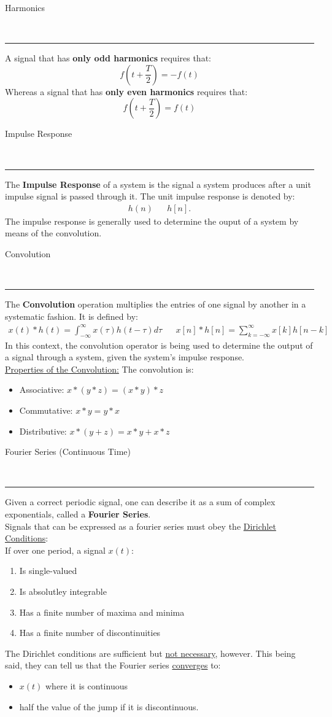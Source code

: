\documentclass{article}
\newcommand{\header}[1]{\begin{large}\noindent #1\end{large}\\\rule{\textwidth}{0.5pt}}
\newcommand{\gap}{\medskip\\}
\begin{document}
\header{Harmonics}
A signal that has \textbf{only odd harmonics} requires that:
\[
    f\left(t+\frac{T}{2}\right) = -f(t)
\]
Whereas a signal that has \textbf{only even harmonics} requires that:
\[
    f\left(t + \frac{T}{2}\right) = f(t)
\]

\header{Impulse Response}

The \textbf{Impulse Response} of a system is the signal a system produces after a
unit impulse signal is passed through it. The unit impulse response is denoted by:
\begin{align*}
     h(n) && h[n].
\end{align*}
The impulse response is generally used to determine the ouput of a system 
by means of the convolution.
\gap
\header{Convolution}

The \textbf{Convolution} operation multiplies the entries of one signal by another in
a systematic fashion. It is defined by:
\begin{align*}
    x(t) \ast h(t) = \int_{-\infty}^\infty x(\tau) h(t- \tau) {d}\tau && x[n] \ast h[n] = \sum_{k=-\infty}^\infty x[k]h[n-k]    
\end{align*}
In this context, the convolution operator is being used to determine the output of a
signal through a system, given the system's impulse response.
\gap
\underline{Properties of the Convolution:} The convolution is:
\begin{itemize}
    \item Associative: $x \ast (y \ast z) = (x \ast y) \ast z$
    \item Commutative: $x \ast y = y \ast x$
    \item Distributive: $x \ast (y + z) = x \ast y + x \ast z$
\end{itemize}

\pagebreak

\header{Fourier Series (Continuous Time)}

Given a correct periodic signal, one can describe it as a sum of complex exponentials,
called a \textbf{Fourier Series}. 
\gap
Signals that can be expressed as a fourier series must obey the \underline{Dirichlet Conditions}:
\gap
If over one period, a signal $x(t)$:
\begin{enumerate}
    \item Is single-valued
    \item Is absolutley integrable
    \item Has a finite number of maxima and minima
    \item Has a finite number of discontinuities
\end{enumerate}
The Dirichlet conditions are sufficient but \underline{not necessary}, however. This
being said, they can tell us that the Fourier series \underline{converges} to:
\begin{itemize}
    \item $x(t)$ where it is continuous
    \item half the value of the jump if it is discontinuous.
\end{itemize}
\end{document}
